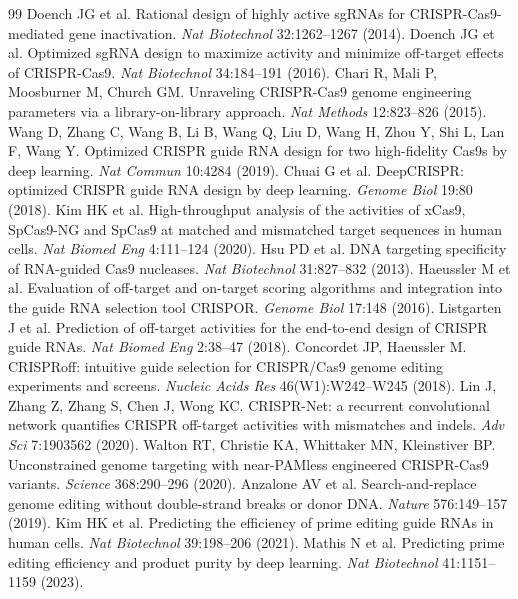 \begin{thebibliography}{99}\small
{} Doench JG et al. Rational design of highly active sgRNAs for CRISPR-Cas9-mediated gene inactivation. \emph{Nat Biotechnol} 32:1262--1267 (2014).
 Doench JG et al. Optimized sgRNA design to maximize activity and minimize off-target effects of CRISPR-Cas9. \emph{Nat Biotechnol} 34:184--191 (2016).
 Chari R, Mali P, Moosburner M, Church GM. Unraveling CRISPR-Cas9 genome engineering parameters via a library-on-library approach. \emph{Nat Methods} 12:823--826 (2015).
 Wang D, Zhang C, Wang B, Li B, Wang Q, Liu D, Wang H, Zhou Y, Shi L, Lan F, Wang Y. Optimized CRISPR guide RNA design for two high-fidelity Cas9s by deep learning. \emph{Nat Commun} 10:4284 (2019).
 Chuai G et al. DeepCRISPR: optimized CRISPR guide RNA design by deep learning. \emph{Genome Biol} 19:80 (2018).
 Kim HK et al. High-throughput analysis of the activities of xCas9, SpCas9-NG and SpCas9 at matched and mismatched target sequences in human cells. \emph{Nat Biomed Eng} 4:111--124 (2020).
 Hsu PD et al. DNA targeting specificity of RNA-guided Cas9 nucleases. \emph{Nat Biotechnol} 31:827--832 (2013).
 Haeussler M et al. Evaluation of off-target and on-target scoring algorithms and integration into the guide RNA selection tool CRISPOR. \emph{Genome Biol} 17:148 (2016).
 Listgarten J et al. Prediction of off-target activities for the end-to-end design of CRISPR guide RNAs. \emph{Nat Biomed Eng} 2:38--47 (2018).
 Concordet JP, Haeussler M. CRISPRoff: intuitive guide selection for CRISPR/Cas9 genome editing experiments and screens. \emph{Nucleic Acids Res} 46(W1):W242--W245 (2018).
 Lin J, Zhang Z, Zhang S, Chen J, Wong KC. CRISPR-Net: a recurrent convolutional network quantifies CRISPR off-target activities with mismatches and indels. \emph{Adv Sci} 7:1903562 (2020).
 Walton RT, Christie KA, Whittaker MN, Kleinstiver BP. Unconstrained genome targeting with near-PAMless engineered CRISPR-Cas9 variants. \emph{Science} 368:290--296 (2020).
 Anzalone AV et al. Search-and-replace genome editing without double-strand breaks or donor DNA. \emph{Nature} 576:149--157 (2019).
 Kim HK et al. Predicting the efficiency of prime editing guide RNAs in human cells. \emph{Nat Biotechnol} 39:198--206 (2021).
 Mathis N et al. Predicting prime editing efficiency and product purity by deep learning. \emph{Nat Biotechnol} 41:1151--1159 (2023).

\end{thebibliography}
